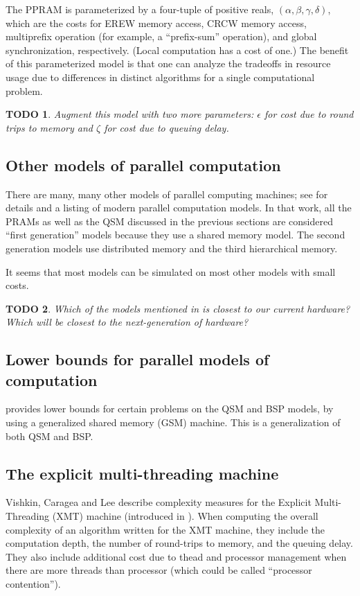 \documentclass{article}
\newtheorem{todo}{TODO}
\begin{document}
The PPRAM is parameterized by a four-tuple of positive reals, $(\alpha, \beta, \gamma, \delta)$, which are the costs for EREW memory access, CRCW memory access, multiprefix operation (for example, a ``prefix-sum'' operation), and global synchronization, respectively.
(Local computation has a cost of one.)
The benefit of this parameterized model is that one can analyze the tradeoffs in resource usage due to differences in distinct algorithms for a single computational problem.

\begin{todo}
  Augment this model with two more parameters: $\epsilon$ for cost due to round trips to memory and $\zeta$ for cost due to queuing delay.
\end{todo}

\subsection{Other models of parallel computation}

There are many, many other models of parallel computing machines; see \cite{zcsm07} for details and a listing of modern parallel computation models.
In that work, all the PRAMs as well as the QSM discussed in the previous sections are considered ``first generation'' models because they use a shared memory model.
The second generation models use distributed memory and the third hierarchical memory.

It seems that most models can be simulated on most other models with small costs.

\begin{todo}
  Which of the models mentioned in \cite{zcsm07} is closest to our current hardware?
  Which will be closest to the next-generation of hardware?
\end{todo}

\subsection{Lower bounds for parallel models of computation}

\cite{mr98} provides lower bounds for certain problems on the QSM and BSP models, by using a generalized shared memory (GSM) machine.
This is a generalization of both QSM and BSP.

\subsection{The explicit multi-threading machine}
Vishkin, Caragea and Lee \cite{vcl06} describe complexity measures for the Explicit Multi-Threading (XMT) machine (introduced in \cite{vdbn98}).
When computing the overall complexity of an algorithm written for the XMT machine, they include the computation depth, the number of round-trips to memory, and the queuing delay.
They also include additional cost due to thead and processor management when there are more threads than processor (which could be called ``processor contention'').
\end{document}
